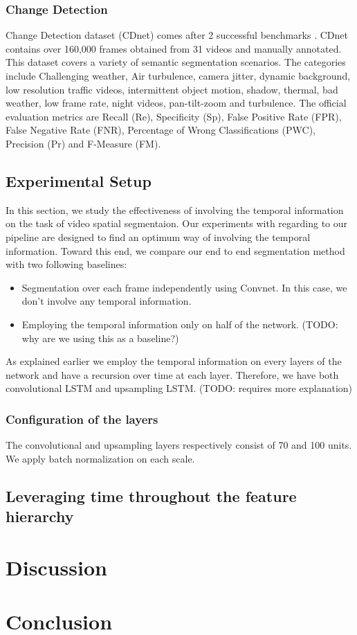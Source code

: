 \subsubsection{Change Detection}
\label{sssec:changedet}
Change Detection dataset (CDnet) comes after 2 successful benchmarks
\cite{wang2014cdnet,goyette2012changedetection}. CDnet contains over 160,000
frames obtained from 31 videos and manually annotated. This dataset covers a
variety of semantic segmentation scenarios. The categories include Challenging
weather, Air turbulence, camera jitter, dynamic background, low resolution
traffic videos, intermittent object motion, shadow, thermal, bad weather, low
frame rate, night videos, pan-tilt-zoom and turbulence. The official evaluation
metrics are Recall (Re), Specificity (Sp), False Positive Rate (FPR), False
Negative Rate (FNR), Percentage of Wrong Classifications (PWC), Precision (Pr)
and F-Measure (FM).

\subsection{Experimental Setup}
\label{ssec:setup}
In this section, we study the effectiveness of involving the temporal
information on the task of video spatial segmentaion. Our experiments with
regarding to our pipeline are designed to find an optimum way of involving the
temporal information.
Toward this end, we compare our end to end segmentation method with two
following baselines:
\begin{itemize}
    \item Segmentation over each frame independently using Convnet. In this
        case, we don't involve any temporal information.
    \item Employing the temporal information only on half of the network. (TODO:
        why are we using this as a baseline?)
\end{itemize}
As explained earlier we employ the temporal information on every layers of the
network and have a recursion over time at each layer. Therefore, we have both
convolutional LSTM and upsampling LSTM. (TODO: requires more explanation)
\subsubsection{Configuration of the layers}
The convolutional and upsampling layers respectively consist of 70 and 100
units. We apply batch normalization on each scale.

\subsection{Leveraging time throughout the feature hierarchy}
\label{ssec:analysis}

\section{Discussion}
\label{sec:disc}
\section{Conclusion}
